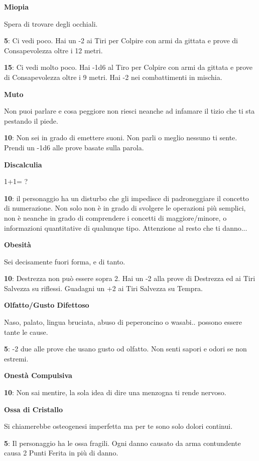 \documentclass[a4paper,twoside,openany]{book}
\begin{document}
\begin{multicols}{2}
\textbf{Miopia}

Spera di trovare degli occhiali.

\textbf{5}: Ci vedi poco. Hai un -2 ai Tiri per Colpire con armi da gittata e prove di Consapevolezza oltre i 12 metri.

\textbf{15}: Ci vedi molto poco. Hai -1d6 al Tiro per Colpire con armi da gittata e prove di Consapevolezza oltre i 9 metri. Hai -2 nei combattimenti in mischia.

\textbf{Muto}

Non puoi parlare e cosa peggiore non riesci neanche ad infamare il tizio che ti sta pestando il piede.

\textbf{10}: Non sei in grado di emettere suoni. Non parli o meglio nessuno ti sente. Prendi un -1d6 alle prove basate sulla parola.

\textbf{Discalculia}

1+1= ?

\textbf{10}: il personaggio ha un disturbo che gli impedisce di padroneggiare il concetto di numerazione. Non solo non è in grado di svolgere le operazioni più semplici, non è neanche in grado di comprendere i concetti di maggiore/minore, o informazioni quantitative di qualunque tipo.
Attenzione al resto che ti danno...

\textbf{Obesità}

Sei decisamente fuori forma, e di tanto.

\textbf{10}: Destrezza non può essere sopra 2. Hai un -2 alla prove di Destrezza ed ai Tiri Salvezza su riflessi. Guadagni un +2 ai Tiri Salvezza su Tempra.

\textbf{Olfatto/Gusto Difettoso}

Naso, palato, lingua bruciata, abuso di peperoncino o wasabi.. possono essere tante le cause.

\textbf{5}: -2 due alle prove che usano gusto od olfatto. Non senti sapori e odori se non estremi.

\textbf{Onestà Compulsiva}

\textbf{10}: Non sai mentire, la sola idea di dire una menzogna ti rende nervoso.

\textbf{Ossa di Cristallo}

Si chiamerebbe osteogenesi imperfetta ma per te sono solo dolori continui.

\textbf{5}: Il personaggio ha le ossa fragili. Ogni danno causato da arma contundente causa 2 Punti Ferita in più di danno.


\end{multicols}
\end{document}
